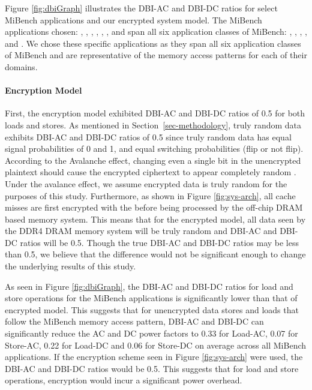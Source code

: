 Figure \ref{fig:dbiGraph} illustrates the DBI-AC and DBI-DC ratios for select
MiBench applications and our encrypted system model. The MiBench applications
chosen: , , , , ,
, and  span all six application classes of MiBench:
, , , ,  and
. We chose these specific applications as they span all six
application classes of MiBench and are representative of the memory access
patterns for each of their domains.

\paragraph{Encryption Model} First, the encryption model exhibited DBI-AC and
DBI-DC ratios of 0.5 for both loads and stores. As mentioned in
Section~\ref{sec-methodology}, truly random data exhibits DBI-AC and DBI-DC
ratios of 0.5 \cite{hollis} since truly random data has equal signal
probabilities of 0 and 1, and equal switching probabilities (flip or not flip).
According to the Avalanche effect, changing even a single bit in the
unencrypted plaintext should cause the encrypted ciphertext to appear
completely random \cite{avalance}. Under the avalance effect, we assume
encrypted data is truly random for the purposes of this study. Furthermore, as
shown in Figure \ref{fig:sys-arch}, all cache misses are first encrypted with
the  before being processed by the off-chip DRAM based
memory system. This means that for the encrypted model, all data seen by the
DDR4 DRAM memory system will be truly random and DBI-AC and DBI-DC ratios will
be 0.5. Though the true DBI-AC and DBI-DC ratios may be less than 0.5, we
believe that the difference would not be significant enough to change the
underlying results of this study.

As seen in Figure \ref{fig:dbiGraph}, the DBI-AC and DBI-DC ratios for load and
store operations for the MiBench applications is significantly lower than that
of encrypted model. This suggests that for unencrypted data stores and loads
that follow the MiBench memory access pattern, DBI-AC and DBI-DC can
significantly reduce the AC and DC power factors to 0.33 for Load-AC,
0.07 for Store-AC, 0.22 for Load-DC and 0.06 for Store-DC on average across all
MiBench applications. If the encryption scheme seen in Figure
\ref{fig:sys-arch} were used, the DBI-AC and DBI-DC ratios would be 0.5. This
suggests that for load and store operations, encryption would incur a
significant power overhead.

